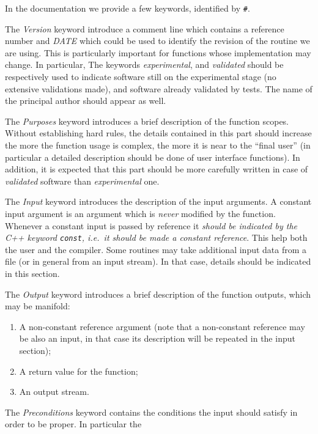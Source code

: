 In the documentation we provide a few keywords, identified by \verb!#!.
\begin{description}
\item The \emph{Version} keyword introduce a comment line which
  contains a reference number and \emph{DATE} which could be used to
  identify the revision of the routine we are using. This is
  particularly important for functions whose implementation may
  change. In particular, The keywords \emph{experimental}, and
  \emph{validated} should be respectively used to indicate software
  still on the experimental stage (no extensive validations made), and
  software already validated by tests. The name of the principal
  author should appear as well.
\item The \emph{Purposes} keyword introduces a brief description of
  the function scopes. Without establishing hard rules, the details
  contained in this part should increase the more the function usage
  is complex, the more it is near to the ``final user'' (in particular
  a detailed description should be done of user interface functions).
  In addition, it is expected that this part should be more carefully
  written in case of \emph{validated} software than
  \emph{experimental} one.
\item The \emph{Input} keyword introduces the description of the
  input arguments. A constant input argument is an argument which is
  \emph{never} modified by the function. Whenever a constant input is
  passed by reference it \emph{should be indicated by the C++ keyword
    \texttt{const}, i.e.\  it should be made a constant reference}. This
  help both the user and the compiler. Some routines may take
  additional input data from a file (or in general from an input
  stream). In that case, details should be indicated in this section.
\item The \emph{Output} keyword introduces a brief description of
  the function outputs, which may be  manifold:
  \begin{enumerate}
  \item A non-constant reference argument (note that a non-constant
    reference may be also an input, in that case its description will
    be repeated in the input section);
  \item A return value for the function;
  \item An output stream.
  \end{enumerate}
\item The \emph{Preconditions} keyword contains the conditions the
  input should satisfy in order to be proper. In particular the

\end{description}
